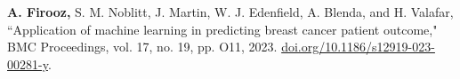\begin{cvpublication}
{\begin{cvitems}
        \end{cvitems}}
        {}
    \cvpub
        {\begin{cvitems}
            \item {\textbf{A. Firooz,} S. M. Noblitt, J. Martin, W. J. Edenfield, A. Blenda, and H. Valafar, “Application of machine learning in predicting breast cancer patient outcome," BMC Proceedings, vol. 17, no. 19, pp. O11, 2023. \href{https://doi.org/10.1186/s12919-023-00281-y}{doi.org/10.1186/s12919-023-00281-y}.}
        \end{cvitems}}
    {}
\end{cvpublication}

